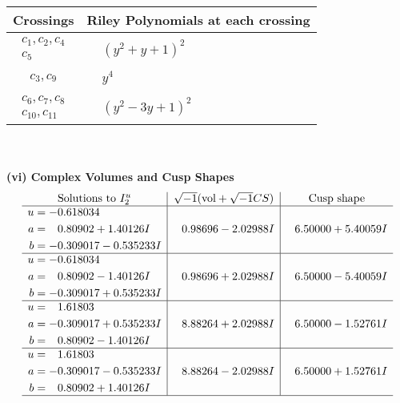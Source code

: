 \documentclass[1p]{elsarticle_modified}
\theoremstyle{definition}
\newcommand{\I}{\sqrt{-1}}
\begin{document}
\begin{tabular}{m{50pt}|m{274pt}}
Crossings & \hspace{64pt}Riley Polynomials at each crossing \\
\hline $$\begin{aligned}c_{1},c_{2},c_{4}\\c_{5}\end{aligned}$$&$\begin{aligned}
&(y^2+y+1)^2
\end{aligned}$\\
\hline $$\begin{aligned}c_{3},c_{9}\end{aligned}$$&$\begin{aligned}
&y^4
\end{aligned}$\\
\hline $$\begin{aligned}c_{6},c_{7},c_{8}\\c_{10},c_{11}\end{aligned}$$&$\begin{aligned}
&(y^2-3 y+1)^2
\end{aligned}$\\
\hline
\end{tabular}\\~\\
\newpage\flushleft \textbf{(vi) Complex Volumes and Cusp Shapes}
$$\begin{array}{c|c|c}  
\text{Solutions to }I^u_{2}& \I (\text{vol} + \sqrt{-1}CS) & \text{Cusp shape}\\
 \hline 
\begin{aligned}
u &= -0.618034\phantom{ +0.000000I} \\
a &= \phantom{-}0.80902 + 1.40126 I \\
b &= -0.309017 - 0.535233 I\end{aligned}
 & \phantom{-}0.98696 - 2.02988 I & \phantom{-}6.50000 + 5.40059 I \\ \hline\begin{aligned}
u &= -0.618034\phantom{ +0.000000I} \\
a &= \phantom{-}0.80902 - 1.40126 I \\
b &= -0.309017 + 0.535233 I\end{aligned}
 & \phantom{-}0.98696 + 2.02988 I & \phantom{-}6.50000 - 5.40059 I \\ \hline\begin{aligned}
u &= \phantom{-}1.61803\phantom{ +0.000000I} \\
a &= -0.309017 + 0.535233 I \\
b &= \phantom{-}0.80902 - 1.40126 I\end{aligned}
 & \phantom{-}8.88264 + 2.02988 I & \phantom{-}6.50000 - 1.52761 I \\ \hline\begin{aligned}
u &= \phantom{-}1.61803\phantom{ +0.000000I} \\
a &= -0.309017 - 0.535233 I \\
b &= \phantom{-}0.80902 + 1.40126 I\end{aligned}
 & \phantom{-}8.88264 - 2.02988 I & \phantom{-}6.50000 + 1.52761 I\\
 \hline 
 \end{array}$$\newpage
\end{document}
